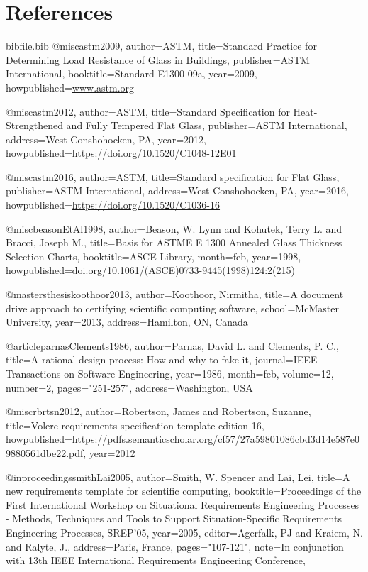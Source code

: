 \documentclass[12pt]{article}
\begin{document}
\section{References}
\label{Sec:References}
\begin{filecontents*}{bibfile.bib}
@misc{astm2009,
author={ASTM},
title={Standard Practice for Determining Load Resistance of Glass in Buildings},
publisher={ASTM International},
booktitle={Standard E1300-09a},
year={2009},
howpublished={\url{www.astm.org}}}

@misc{astm2012,
author={ASTM},
title={Standard Specification for Heat-Strengthened and Fully Tempered Flat Glass},
publisher={ASTM International},
address={West Conshohocken, PA},
year={2012},
howpublished={\url{https://doi.org/10.1520/C1048-12E01}}}

@misc{astm2016,
author={ASTM},
title={Standard specification for Flat Glass},
publisher={ASTM International},
address={West Conshohocken, PA},
year={2016},
howpublished={\url{https://doi.org/10.1520/C1036-16}}}

@misc{beasonEtAl1998,
author={Beason, W. Lynn and Kohutek, Terry L. and Bracci, Joseph M.},
title={Basis for ASTME E 1300 Annealed Glass Thickness Selection Charts},
booktitle={ASCE Library},
month={feb},
year={1998},
howpublished={\url{doi.org/10.1061/(ASCE)0733-9445(1998)124:2(215)}}}

@mastersthesis{koothoor2013,
author={Koothoor, Nirmitha},
title={A document drive approach to certifying scientific computing software},
school={McMaster University},
year={2013},
address={Hamilton, ON, Canada}}

@article{parnasClements1986,
author={Parnas, David L. and Clements, P. C.},
title={A rational design process: How and why to fake it},
journal={IEEE Transactions on Software Engineering},
year={1986},
month={feb},
volume={12},
number={2},
pages={"251-257"},
address={Washington, USA}}

@misc{rbrtsn2012,
author={Robertson, James and Robertson, Suzanne},
title={Volere requirements specification template edition 16},
howpublished={\url{https://pdfs.semanticscholar.org/cf57/27a59801086cbd3d14e587e09880561dbe22.pdf}},
year={2012}}

@inproceedings{smithLai2005,
author={Smith, W. Spencer and Lai, Lei},
title={A new requirements template for scientific computing},
booktitle={Proceedings of the First International Workshop on Situational Requirements Engineering Processes - Methods, Techniques and Tools to Support Situation-Specific Requirements Engineering Processes, SREP'05},
year={2005},
editor={Agerfalk, PJ and Kraiem, N. and Ralyte, J.},
address={Paris, France},
pages={"107-121"},
note={In conjunction with 13th IEEE International Requirements Engineering Conference,}}
\end{filecontents*}
\nocite{*}
\printbibliography[heading=none]
\end{document}
